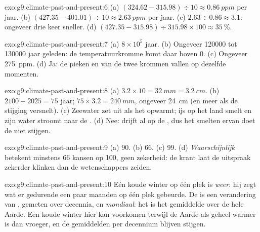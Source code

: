 \begin{solution}{exo:g9:climate-past-and-present:6}
(a) $(324.62 - 315.98) \div 10 \approx \qty{0.86}{ppm}$ per jaar. (b)
$(427.35 - 401.01) \div 10 \approx \qty{2.63}{ppm}$ per jaar. (c) $2.63
\div 0.86 \approx 3.1$: ongeveer drie keer sneller. (d) $(427.35 - 315.98)
\div 315.98 \times 100 \approx 35~\%$.
\end{solution}

\begin{solution}{exo:g9:climate-past-and-present:7}
(a) $8 \times 10^5$ jaar. (b) Ongeveer \num{120000} tot \num{130000} jaar
geleden: de temperatuurkromme komt daar boven 0. (c) Ongeveer
\qty{275}{ppm}. (d) Ja: de pieken en  van de twee krommen vallen op
dezelfde momenten.
\end{solution}

\begin{solution}{exo:g9:climate-past-and-present:8}
(a) $3.2 \times 10 = \qty{32}{mm} = \qty{3.2}{cm}$. (b) $2100 - 2025 =
75$ jaar; $75 \times 3.2 = \qty{240}{mm}$, ongeveer \qty{24}{cm} (en meer
als de stijging versnelt). (c) Zeewater zet uit als het opwarmt; ijs op
het land smelt en zijn water stroomt naar de . (d) Nee:  drijft
al op de , dus het smelten ervan doet de  niet stijgen.
\end{solution}

\begin{solution}{exo:g9:climate-past-and-present:9}
(a) 90. (b) 66. (c) 99. (d) \emph{Waarschijnlijk} betekent minstens 66
kansen op 100, geen zekerheid: de krant laat de uitspraak zekerder klinken
dan de wetenschappers zeiden.
\end{solution}

\begin{solution}{exo:g9:climate-past-and-present:10}
Eén koude winter op één plek is \emph{weer}: hij zegt wat er gedurende een
paar maanden op één plek gebeurde. De  is een
verandering van \emph{}, gemeten over decennia, en \emph{mondiaal}:
het is het gemiddelde over de hele Aarde. Een koude winter hier kan
voorkomen terwijl de Aarde als geheel warmer is dan vroeger, en de
gemiddelden per decennium blijven stijgen.
\end{solution}

